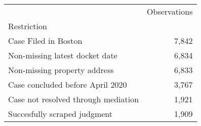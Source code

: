 \begin{tabular}{lr}
\toprule
 & Observations \\
Restriction &  \\
\midrule
Case Filed in Boston & 7,842 \\
Non-missing latest docket date & 6,834 \\
Non-missing property address & 6,833 \\
Case concluded before April 2020 & 3,767 \\
Case not resolved through mediation & 1,921 \\
Succesfully scraped judgment & 1,909 \\
\bottomrule
\end{tabular}

